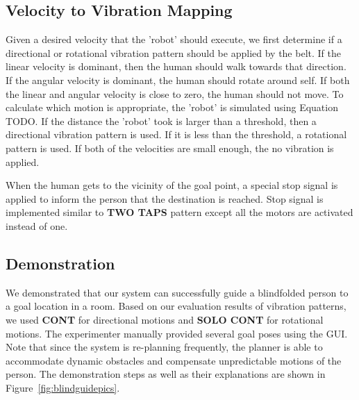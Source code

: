 \subsection{Velocity to Vibration Mapping}


Given a desired velocity that the 'robot' should execute, we first determine if a directional or rotational vibration pattern should be applied by the belt. If the linear velocity is dominant, then the human should walk towards that direction. If the angular velocity is dominant, the human should rotate around self. If both the linear and angular velocity is close to zero, the human should not move. To calculate which motion is appropriate, the 'robot' is simulated using Equation TODO. If the distance the 'robot' took is larger than a threshold, then a directional vibration pattern is used. If it is less than the threshold, a rotational pattern is used. If both of the velocities are small enough, the no vibration is applied. 

When the human gets to the vicinity of the goal point, a special stop signal is applied to inform the person that the destination is reached. Stop signal is implemented similar to \textbf{TWO TAPS} pattern except all the motors are activated instead of one.

\subsection{Demonstration}

We demonstrated that our system can successfully guide a blindfolded person to a goal location in a room. Based on our evaluation results of vibration patterns, we used \textbf{CONT} for directional motions and \textbf{SOLO CONT} for rotational motions. The experimenter manually provided several goal poses using the GUI. Note that since the system is re-planning frequently, the planner is able to accommodate dynamic obstacles and compensate unpredictable motions of the person. The demonstration steps as well as their explanations are shown in Figure~\ref{fig:blindguidepics}.

